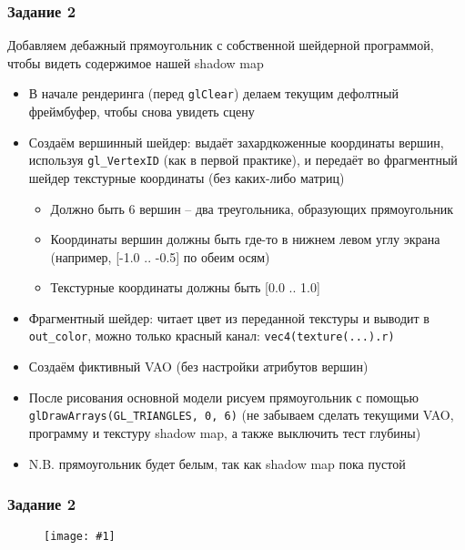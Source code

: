 \documentclass{beamer}
\newcommand{\slideimage}[1]{
  \begin{figure}
    \begin{adjustbox}{width=\textwidth, totalheight=\textheight-2\baselineskip-2\baselineskip,keepaspectratio}
      \texttt{[image: \#1]}
    \end{adjustbox}
  \end{figure}
}
\begin{document}
\begin{frame}[fragile]
\frametitle{Задание 2}
\fontsize{10pt}{10pt}
Добавляем дебажный прямоугольник с собственной шейдерной программой, чтобы видеть содержимое нашей shadow map
\begin{itemize}
\item В начале рендеринга (перед \verb|glClear|) делаем текущим дефолтный фреймбуфер, чтобы снова увидеть сцену
\item Создаём вершинный шейдер: выдаёт захардкоженные координаты вершин, используя \verb|gl_VertexID| (как в первой практике), и передаёт во фрагментный шейдер текстурные координаты (без каких-либо матриц)
\begin{itemize}
\item Должно быть 6 вершин -- два треугольника, образующих прямоугольник
\item Координаты вершин должны быть где-то в нижнем левом углу экрана (например, [-1.0 .. -0.5] по обеим осям)
\item Текстурные координаты должны быть [0.0 .. 1.0]
\end{itemize}
\item Фрагментный шейдер: читает цвет из переданной текстуры и выводит в \verb|out_color|, можно только красный канал: \verb|vec4(texture(...).r)|
\item Создаём фиктивный VAO (без настройки атрибутов вершин)
\item После рисования основной модели рисуем прямоугольник с помощью \verb|glDrawArrays(GL_TRIANGLES, 0, 6)| (не забываем сделать текущими VAO, программу и текстуру shadow map, а также выключить тест глубины)
\item N.B. прямоугольник будет белым, так как shadow map пока пустой
\end{itemize}
\end{frame}

\begin{frame}[fragile]
\frametitle{Задание 2}
\slideimage{2.png}
\end{frame}
\end{document}
